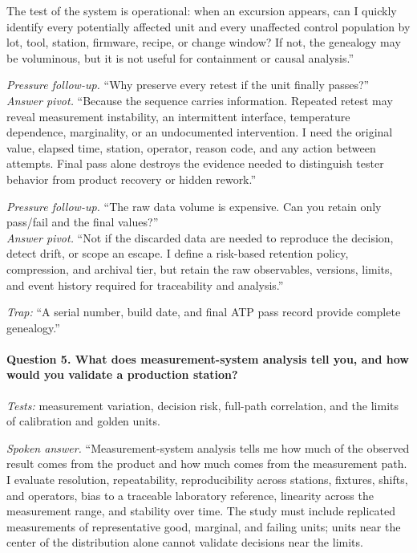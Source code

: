 The test of the system is operational: when an excursion appears, can I quickly
identify every potentially affected unit and every unaffected control
population by lot, tool, station, firmware, recipe, or change window? If not,
the genealogy may be voluminous, but it is not useful for containment or causal
analysis.''

\textit{Pressure follow-up.} ``Why preserve every retest if the unit finally
passes?''\\
\textit{Answer pivot.} ``Because the sequence carries information. Repeated
retest may reveal measurement instability, an intermittent interface,
temperature dependence, marginality, or an undocumented intervention. I need
the original value, elapsed time, station, operator, reason code, and any action
between attempts. Final pass alone destroys the evidence needed to distinguish
tester behavior from product recovery or hidden rework.''

\textit{Pressure follow-up.} ``The raw data volume is expensive. Can you retain
only pass/fail and the final values?''\\
\textit{Answer pivot.} ``Not if the discarded data are needed to reproduce the
decision, detect drift, or scope an escape. I define a risk-based retention
policy, compression, and archival tier, but retain the raw observables,
versions, limits, and event history required for traceability and analysis.''

\textit{Trap:} ``A serial number, build date, and final ATP pass record provide
complete genealogy.''

\paragraph{Question 5. What does measurement-system analysis tell you, and how
would you validate a production station?}
\textit{Tests:} measurement variation, decision risk, full-path correlation,
and the limits of calibration and golden units.

\textit{Spoken answer.}
``Measurement-system analysis tells me how much of the observed result comes
from the product and how much comes from the measurement path. I evaluate
resolution, repeatability, reproducibility across stations, fixtures, shifts,
and operators, bias to a traceable laboratory reference, linearity across the
measurement range, and stability over time. The study must include replicated
measurements of representative good, marginal, and failing units; units near
the center of the distribution alone cannot validate decisions near the limits.

